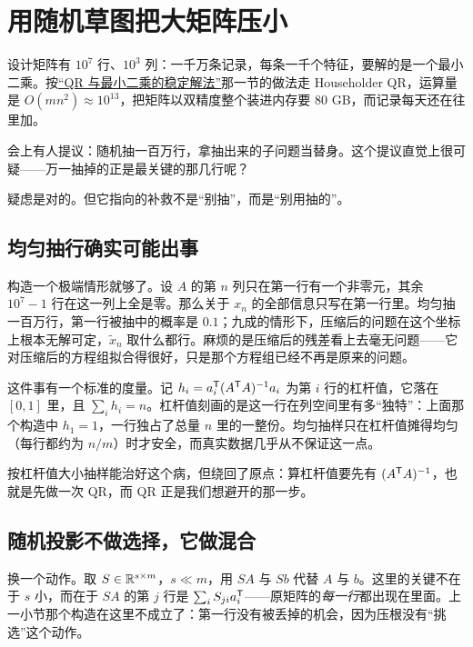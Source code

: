 \section{用随机草图把大矩阵压小}
\label{sec:08-Numerical-Analysis/05-Numerical-Linear-Algebra/08}

设计矩阵有 \(10^7\) 行、\(10^3\) 列：一千万条记录，每条一千个特征，要解的是一个最小二乘。按\hyperref[sec:08-Numerical-Analysis/05-Numerical-Linear-Algebra/02]{``QR 与最小二乘的稳定解法''}那一节的做法走 Householder QR，运算量是 \(O(mn^2)\approx10^{13}\)，把矩阵以双精度整个装进内存要 80 GB，而记录每天还在往里加。

会上有人提议：随机抽一百万行，拿抽出来的子问题当替身。这个提议直觉上很可疑——万一抽掉的正是最关键的那几行呢？

疑虑是对的。但它指向的补救不是``别抽''，而是``别用抽的''。

\subsection{均匀抽行确实可能出事}

构造一个极端情形就够了。设 \(A\) 的第 \(n\) 列只在第一行有一个非零元，其余 \(10^7-1\) 行在这一列上全是零。那么关于 \(x_n\) 的全部信息只写在第一行里。均匀抽一百万行，第一行被抽中的概率是 \(0.1\)；九成的情形下，压缩后的问题在这个坐标上根本无解可定，\(\tilde x_n\) 取什么都行。麻烦的是压缩后的残差看上去毫无问题——它对压缩后的方程组拟合得很好，只是那个方程组已经不再是原来的问题。

这件事有一个标准的度量。记 \(h_i=a_i^{\mathsf{T}}(A^{\mathsf{T}}A)^{-1}a_i\) 为第 \(i\) 行的杠杆值，它落在 \([0,1]\) 里，且 \(\sum_i h_i=n\)。杠杆值刻画的是这一行在列空间里有多``独特''：上面那个构造中 \(h_1=1\)，一行独占了总量 \(n\) 里的一整份。均匀抽样只在杠杆值摊得均匀（每行都约为 \(n/m\)）时才安全，而真实数据几乎从不保证这一点。

按杠杆值大小抽样能治好这个病，但绕回了原点：算杠杆值要先有 \((A^{\mathsf{T}}A)^{-1}\)，也就是先做一次 QR，而 QR 正是我们想避开的那一步。

\subsection{随机投影不做选择，它做混合}

换一个动作。取 \(S\in\mathbb{R}^{s\times m}\)，\(s\ll m\)，用 \(SA\) 与 \(Sb\) 代替 \(A\) 与 \(b\)。这里的关键不在于 \(s\) 小，而在于 \(SA\) 的第 \(j\) 行是 \(\sum_i S_{ji}a_i^{\mathsf{T}}\)——原矩阵的\emph{每一行}都出现在里面。上一小节那个构造在这里不成立了：第一行没有被丢掉的机会，因为压根没有``挑选''这个动作。

